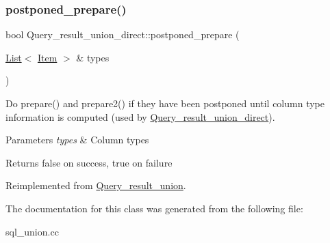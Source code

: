 \subsubsection{\texorpdfstring{postponed\+\_\+prepare()}{postponed\_prepare()}}
{\footnotesize\ttfamily bool Query\+\_\+result\+\_\+union\+\_\+direct\+::postponed\+\_\+prepare (\begin{DoxyParamCaption}\item[{\mbox{\hyperlink{classList}{List}}$<$ \mbox{\hyperlink{classItem}{Item}} $>$ \&}]{types }\end{DoxyParamCaption})\hspace{0.3cm}{\ttfamily [virtual]}}

Do prepare() and prepare2() if they have been postponed until column type information is computed (used by \mbox{\hyperlink{classQuery__result__union__direct}{Query\+\_\+result\+\_\+union\+\_\+direct}}).


\begin{DoxyParams}{Parameters}
{\em types} & Column types\\
\hline
\end{DoxyParams}
\begin{DoxyReturn}{Returns}
false on success, true on failure 
\end{DoxyReturn}


Reimplemented from \mbox{\hyperlink{classQuery__result__union_ad110a83be28d4f91cfd4c7c534defcc9}{Query\+\_\+result\+\_\+union}}.



The documentation for this class was generated from the following file\+:\begin{DoxyCompactItemize}
\item 
sql\+\_\+union.\+cc\end{DoxyCompactItemize}
